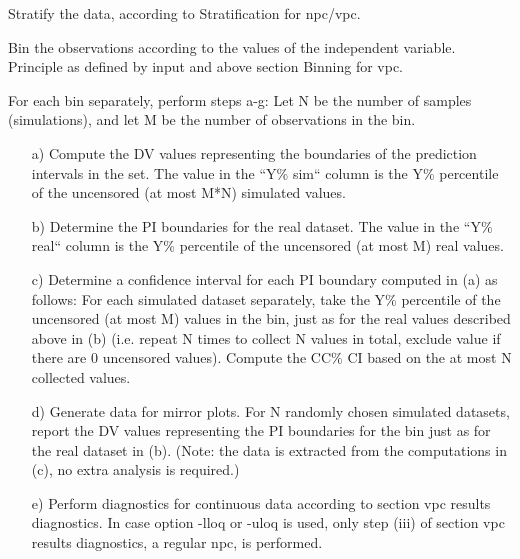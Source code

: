 Stratify the data, according to Stratification for npc/vpc.

Bin the observations according to the values of the independent variable. Principle as defined by input and above section Binning for vpc.

For each bin separately, perform steps a-g: 
Let N be the number of samples (simulations), and let M be the number of observations in the bin.
\begin{itemize}
	\item[a)] Compute the DV values representing the boundaries of the prediction intervals in the set. The value in the “Y\% sim“ column is the Y\% percentile of the uncensored (at most M*N) simulated values.

	\item[b)] Determine the PI boundaries for the real dataset. The value in the “Y\% real“ column is the Y\% percentile of the uncensored (at most M) real values.

	\item[c)] Determine a confidence interval for each PI boundary computed in (a) as follows: 
For each simulated dataset separately, take the Y\% percentile of the uncensored (at most M) values in the bin, just as for the real values described above in (b) (i.e. repeat N times to collect N values in total, exclude value if there are 0 uncensored values). Compute the CC\% CI based on the at most N collected values.

	\item[d)] Generate data for mirror plots. For N randomly chosen simulated datasets, report the DV values representing the PI boundaries for the bin just as for the real dataset in (b). (Note: the data is extracted from the computations in (c), no extra analysis is required.)

	\item[e)] Perform diagnostics for continuous data according to section vpc results diagnostics. In case option -lloq or -uloq is used, only step (iii) of section vpc results diagnostics, a regular npc, is performed.  


\end{itemize}
